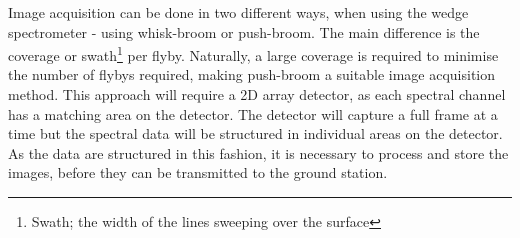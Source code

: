 Image acquisition can be done in two different ways, when using the wedge spectrometer - using whisk-broom or push-broom. The main difference is the coverage or swath\footnote{Swath; the width of the lines sweeping over the surface} per flyby. Naturally, a large coverage is required to minimise the number of flybys required, making push-broom a suitable image acquisition method. This approach will require a 2D array detector, as each spectral channel has a matching area on the detector. The detector will capture a full frame at a time but the spectral data will be structured in individual areas on the detector. As the data are structured in this fashion, it is necessary to process and store the images, before they can be transmitted to the ground station.
